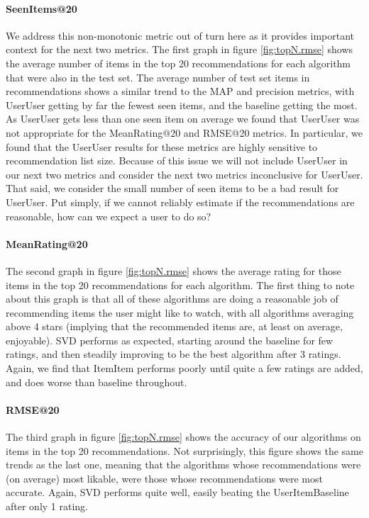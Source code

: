 \documentclass[letterpaper]{sig-alternate}
\begin{document}
  \paragraph{SeenItems@20}
  We address this non-monotonic metric out of turn here as it provides important context for the next two metrics.
  The first graph in figure \ref{fig:topN.rmse} shows the average number of items in the top 20 recommendations for each algorithm that were also in the test set.
  The average number of test set items in recommendations shows a similar trend to the MAP and precision metrics, with UserUser getting by far the fewest seen items, and the baseline getting the most.
  As UserUser gets less than one seen item on average we found that UserUser was not appropriate for the MeanRating@20 and RMSE@20 metrics.
  In particular, we found that the UserUser results for these metrics are highly sensitive to recommendation list size.
  Because of this issue we will not include UserUser in our next two metrics and consider the next two metrics inconclusive for UserUser.
  That said, we consider the small number of seen items to be a bad result for UserUser.
  Put simply, if we cannot reliably estimate if the recommendations are reasonable, how can we expect a user to do so?

  \paragraph{MeanRating@20}
  The second graph in figure \ref{fig:topN.rmse} shows the average rating for those items in the top 20 recommendations for each algorithm.
  The first thing to note about this graph is that all of these algorithms are doing a reasonable job of recommending items the user might like to watch, with all algorithms averaging above 4 stars (implying that the recommended items are, at least on average, enjoyable).
  SVD performs as expected, starting around the baseline for few ratings, and then steadily improving to be the best algorithm after 3 ratings.
  Again, we find that ItemItem performs poorly until quite a few ratings are added, and does worse than baseline throughout.
    
  \paragraph{RMSE@20}
  The third graph in figure \ref{fig:topN.rmse} shows the accuracy of our algorithms on items in the top 20 recommendations.
  Not surprisingly, this figure shows the same trends as the last one, meaning that the algorithms whose recommendations were (on average) most likable, were those whose recommendations were most accurate.
  Again, SVD performs quite well, easily beating the UserItemBaseline after only 1 rating.
  
\end{document}
